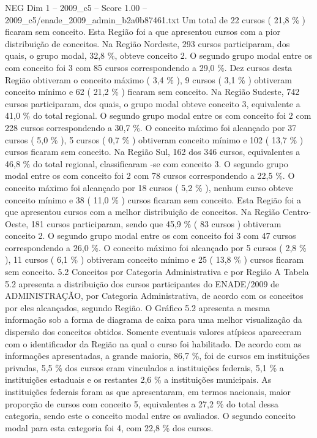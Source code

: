 \begin{textsample}{NEG Dim 1 – 2009\_c5 – Score 1.00 – 2009\_c5/enade\_2009\_admin\_b2a0b87461.txt}
Um total de 22 cursos ( 21,8 \% ) ficaram sem conceito.
Esta Região foi a que apresentou cursos com a pior distribuição de conceitos.
Na Região Nordeste, 293 cursos participaram, dos quais, o grupo modal, 32,8 \%, obteve conceito 2.
O segundo grupo modal entre os com conceito foi 3 com 85 cursos correspondendo a 29,0 \%.
Dez cursos desta Região obtiveram o conceito máximo ( 3,4 \% ), 9 cursos ( 3,1 \% ) obtiveram conceito mínimo e 62 ( 21,2 \% ) ficaram sem conceito.
Na Região Sudeste, 742 cursos participaram, dos quais, o grupo modal obteve conceito 3, equivalente a 41,0 \% do total regional.
O segundo grupo modal entre os com conceito foi 2 com 228 cursos correspondendo a 30,7 \%.
O conceito máximo foi alcançado por 37 cursos ( 5,0 \% ), 5 cursos ( 0,7 \% ) obtiveram conceito mínimo e 102 ( 13,7 \% ) cursos ficaram sem conceito.
Na Região Sul, 162 dos 346 cursos, equivalentes a 46,8 \% do total regional, classificaram -se com conceito 3.
O segundo grupo modal entre os com conceito foi 2 com 78 cursos correspondendo a 22,5 \%.
O conceito máximo foi alcançado por 18 cursos ( 5,2 \% ), nenhum curso obteve conceito mínimo e 38 ( 11,0 \% ) cursos ficaram sem conceito.
Esta Região foi a que apresentou cursos com a melhor distribuição de conceitos.
Na Região Centro-Oeste, 181 cursos participaram, sendo que 45,9 \% ( 83 cursos ) obtiveram conceito 2.
O segundo grupo modal entre os com conceito foi 3 com 47 cursos correspondendo a 26,0 \%.
O conceito máximo foi alcançado por 5 cursos ( 2,8 \% ), 11 cursos ( 6,1 \% ) obtiveram conceito mínimo e 25 ( 13,8 \% ) cursos ficaram sem conceito. 5.2 Conceitos por Categoria Administrativa e por Região A Tabela 5.2 apresenta a distribuição dos cursos participantes do ENADE/2009 de ADMINISTRAÇÃO, por Categoria Administrativa, de acordo com os conceitos por eles alcançados, segundo Região.
O Gráfico 5.2 apresenta a mesma informação sob a forma de diagrama de caixa para uma melhor visualização da dispersão dos conceitos obtidos.
Somente eventuais valores atípicos apareceram com o identificador da Região na qual o curso foi habilitado.
De acordo com as informações apresentadas, a grande maioria, 86,7 \%, foi de cursos em instituições privadas, 5,5 \% dos cursos eram vinculados a instituições federais, 5,1 \% a instituições estaduais e os restantes 2,6 \% a instituições municipais.
As instituições federais foram as que apresentaram, em termos nacionais, maior proporção de cursos com conceito 5, equivalentes a 27,2 \% do total dessa categoria, sendo este o conceito modal entre os avaliados.
O segundo conceito modal para esta categoria foi 4, com 22,8 \% dos cursos.

\end{textsample}
